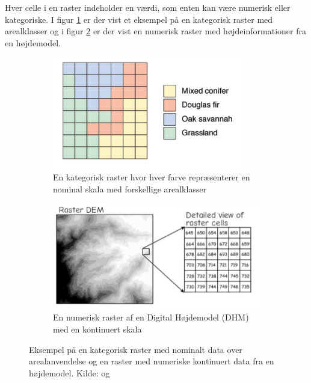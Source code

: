 Hver celle i en raster indeholder en værdi, som enten kan være numerisk eller kategoriske. I figur \ref{Subfig: Kategorisk raster} er der vist et eksempel på en kategorisk raster med arealklasser og i figur \ref{Subfig: Kontinuer raster} er der vist en numerisk raster med højdeinformationer fra en højdemodel. 
\begin{figure}[H]
    \begin{subfigure} [b]{0.5\textwidth}
        \centering
        \includegraphics[width=1\linewidth]{images/teori/raster_areal.png}
        \caption{En kategorisk raster hvor hver farve repræsenterer en nominal skala med forskellige arealklasser }
        \label{Subfig: Kategorisk raster}
    \end{subfigure}
    \begin{subfigure} [b]{0.5\textwidth}
        \centering
        \includegraphics[width=1\linewidth]{images/teori/raster_kontinuert.jpg}
        \caption{En numerisk raster af en Digital Højdemodel (DHM) med en kontinuert skala}
        \label{Subfig: Kontinuer raster}
    \end{subfigure}
    \caption{Eksempel på en kategorisk raster med nominalt data over arealanvendelse og en raster med numeriske kontinuert data fra en højdemodel. Kilde: \cite[s. 67]{longley_geographical_2008} og \cite[s. 66]{bolstad_gis_2022}}
    \label{Figur: Kontinuert og kategorisk raster}
\end{figure}

